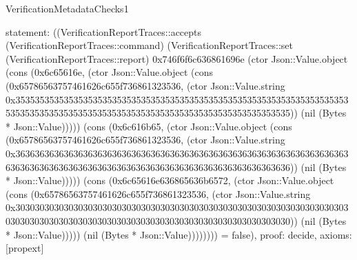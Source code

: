 \begin{lexlean}{VerificationMetadataChecks1}
\begin{semanticmodule}
{  statement: ((VerificationReportTraces::accepts (VerificationReportTraces::command) (VerificationReportTraces::set (VerificationReportTraces::report) 0x746f6f6c636861696e (ctor Json::Value.object (cons (0x6c65616e, (ctor Json::Value.object (cons (0x65786563757461626c655f736861323536, (ctor Json::Value.string 0x35353535353535353535353535353535353535353535353535353535353535353535353535353535353535353535353535353535353535353535353535353535)) (nil (Bytes * Json::Value))))) (cons (0x6c616b65, (ctor Json::Value.object (cons (0x65786563757461626c655f736861323536, (ctor Json::Value.string 0x36363636363636363636363636363636363636363636363636363636363636363636363636363636363636363636363636363636363636363636363636363636)) (nil (Bytes * Json::Value))))) (cons (0x6c65616e636865636b6572, (ctor Json::Value.object (cons (0x65786563757461626c655f736861323536, (ctor Json::Value.string 0x30303030303030303030303030303030303030303030303030303030303030303030303030303030303030303030303030303030303030303030303030303030)) (nil (Bytes * Json::Value))))) (nil (Bytes * Json::Value)))))))) = false),
  proof: decide{},
  axioms: [propext]
}
\end{semanticmodule}
\end{lexlean}
